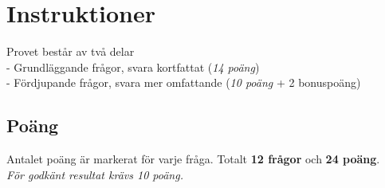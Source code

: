 \documentclass{exam}
\begin{document}
\section*{Instruktioner}
Provet består av två delar \\
    - Grundläggande frågor, svara kortfattat (\textit{14 poäng})\\
    - Fördjupande frågor, svara mer omfattande (\textit{10 poäng} + 2 bonuspoäng)

\subsection*{Poäng}
Antalet poäng är markerat för varje fråga. Totalt \textbf{12 frågor} och \textbf{24 poäng}.\\ \textit{För godkänt resultat krävs 10 poäng.}
\end{document}
